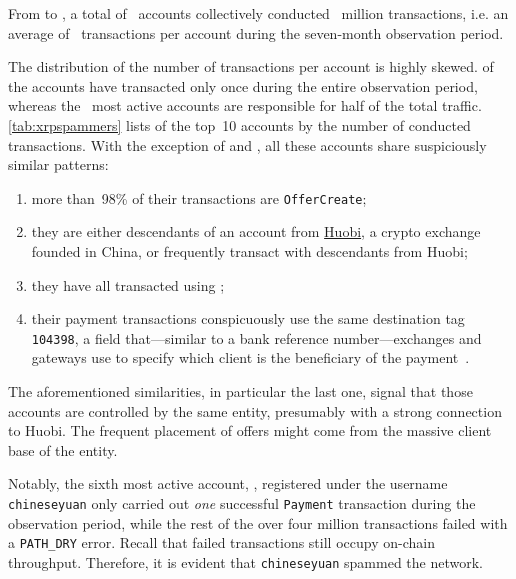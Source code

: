From \startdate to \finishdate, a total of~ accounts collectively conducted~ million transactions, i.e. an average of~ transactions per account during the seven-month observation period.

The distribution of the number of transactions per account is highly skewed.
 of the accounts have transacted only once during the entire observation period, whereas the~ most active accounts are responsible for half of the total traffic.
\autoref{tab:xrpspammers} lists of the top~10 accounts by the number of conducted transactions.
With the exception of  and , all these accounts share suspiciously similar patterns:
\begin{enumerate}
	\item more than~98\% of their transactions are \texttt{OfferCreate};
	\item they are either descendants of an account from \href{https://www.huobi.com/}{Huobi}, a crypto exchange founded in China, or frequently transact with descendants from Huobi;
	\item they have all transacted using ;
	\item their payment transactions conspicuously use the same destination tag \texttt{104398}, a field that---similar to a bank reference number---exchanges and gateways use to specify which client is the beneficiary of the payment~\cite{XRPLedger2020b}.
\end{enumerate}
%
The aforementioned similarities, in particular the last one, signal that those accounts are controlled by the same entity, presumably with a strong connection to Huobi.
The frequent placement of offers might come from the massive client base of the entity.

Notably, the sixth most active account, , registered under the username \texttt{chineseyuan} only carried out \textit{one} successful \texttt{Payment} transaction during the observation period, while the rest of the over four million transactions failed with a \texttt{PATH\_DRY} error. Recall that failed transactions still occupy on-chain throughput. Therefore, it is evident that \texttt{chineseyuan} spammed the network.



